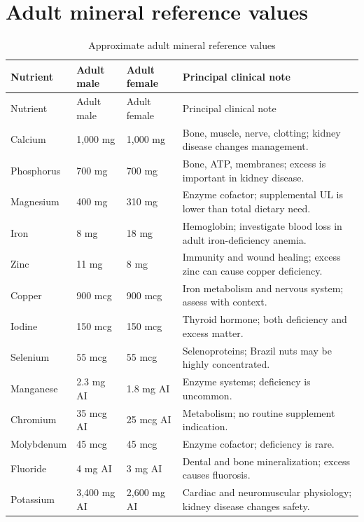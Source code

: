\section{Adult mineral reference values}
\small
\begin{longtable}{p{}p{}p{}p{}}
\caption{Approximate adult mineral reference values}\\
\toprule
Nutrient & Adult male & Adult female & Principal clinical note \\
\midrule
\endfirsthead
\toprule Nutrient & Adult male & Adult female & Principal clinical note \\
\midrule
\endhead
Calcium & 1,000 mg & 1,000 mg & Bone, muscle, nerve, clotting; kidney disease changes management.\\
Phosphorus & 700 mg & 700 mg & Bone, ATP, membranes; excess is important in kidney disease.\\
Magnesium & 400 mg & 310 mg & Enzyme cofactor; supplemental UL is lower than total dietary need.\\
Iron & 8 mg & 18 mg & Hemoglobin; investigate blood loss in adult iron-deficiency anemia.\\
Zinc & 11 mg & 8 mg & Immunity and wound healing; excess zinc can cause copper deficiency.\\
Copper & 900 mcg & 900 mcg & Iron metabolism and nervous system; assess with context.\\
Iodine & 150 mcg & 150 mcg & Thyroid hormone; both deficiency and excess matter.\\
Selenium & 55 mcg & 55 mcg & Selenoproteins; Brazil nuts may be highly concentrated.\\
Manganese & 2.3 mg AI & 1.8 mg AI & Enzyme systems; deficiency is uncommon.\\
Chromium & 35 mcg AI & 25 mcg AI & Metabolism; no routine supplement indication.\\
Molybdenum & 45 mcg & 45 mcg & Enzyme cofactor; deficiency is rare.\\
Fluoride & 4 mg AI & 3 mg AI & Dental and bone mineralization; excess causes fluorosis.\\
Potassium & 3,400 mg AI & 2,600 mg AI & Cardiac and neuromuscular physiology; kidney disease changes safety.\\
\bottomrule
\end{longtable}
\normalsize

